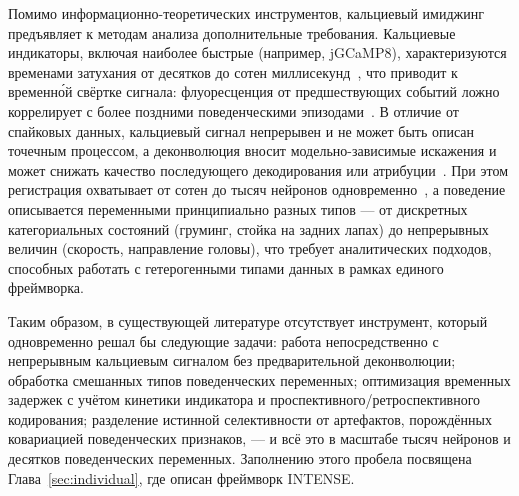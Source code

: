 Помимо информационно-теоретических инструментов, кальциевый имиджинг предъявляет к методам анализа дополнительные требования.
Кальциевые индикаторы, включая наиболее быстрые (например, jGCaMP8), характеризуются временами затухания от десятков до сотен миллисекунд~\cite{Zhang2023}, что приводит к временн\'{о}й свёртке сигнала: флуоресценция от предшествующих событий ложно коррелирует с более поздними поведенческими эпизодами~\cite{Wei2020}.
В отличие от спайковых данных, кальциевый сигнал непрерывен и не может быть описан точечным процессом, а деконволюция вносит модельно-зависимые искажения и может снижать качество последующего декодирования или атрибуции~\cite{Rupprecht2021}.
При этом регистрация охватывает от сотен до тысяч нейронов одновременно~\cite{Chen2013, Zong2022}, а поведение описывается переменными принципиально разных типов --- от дискретных категориальных состояний (груминг, стойка на задних лапах) до непрерывных величин (скорость, направление головы), что требует аналитических подходов, способных работать с гетерогенными типами данных в рамках единого фреймворка.

Таким образом, в существующей литературе отсутствует инструмент, который одновременно решал бы следующие задачи: работа непосредственно с непрерывным кальциевым сигналом без предварительной деконволюции; обработка смешанных типов поведенческих переменных; оптимизация временных задержек с учётом кинетики индикатора и проспективного/ретроспективного кодирования; разделение истинной селективности от артефактов, порождённых ковариацией поведенческих признаков, --- и всё это в масштабе тысяч нейронов и десятков поведенческих переменных. Заполнению этого пробела посвящена Глава~\ref{sec:individual}, где описан фреймворк INTENSE.
